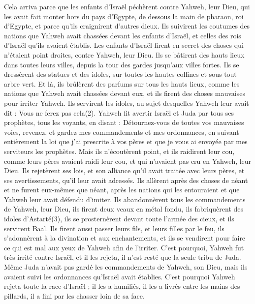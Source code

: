 \begin{multicols}{2}
Cela arriva parce que les enfants d’Israël péchèrent contre Yahweh, leur Dieu, qui les avait fait monter hors du pays d’Egypte, de dessous la main de pharaon, roi d’Egypte, et parce qu’ils craignirent d’autres dieux.
Ils suivirent les coutumes des nations que Yahweh avait chassées devant les enfants d’Israël, et celles des rois d’Israël qu’ils avaient établis.
Les enfants d’Israël firent en secret des choses qui n’étaient point droites, contre Yahweh, leur Dieu. Ils se bâtirent des hauts lieux dans toutes leurs villes, depuis la tour des gardes jusqu’aux villes fortes.
Ils se dressèrent des statues et des idoles, sur toutes les hautes collines et sous tout arbre vert.
Et là, ils brûlèrent des parfums sur tous les hauts lieux, comme les nations que Yahweh avait chassées devant eux, et ils firent des choses mauvaises pour irriter Yahweh.
Ils servirent les idoles, au sujet desquelles Yahweh leur avait dit : Vous ne ferez pas cela(2).
Yahweh fit avertir Israël et Juda par tous ses prophètes, tous les voyants, en disant : Détournez-vous de toutes vos mauvaises voies, revenez, et gardez mes commandements et mes ordonnances, en suivant entièrement la loi que j’ai prescrite à vos pères et que je vous ai envoyée par mes serviteurs les prophètes.
Mais ils n’écoutèrent point, et ils raidirent leur cou, comme leurs pères avaient raidi leur cou, et qui n’avaient pas cru en Yahweh, leur Dieu.
Ils rejetèrent ses lois, et son alliance qu’il avait traitée avec leurs pères, et ses avertissements, qu’il leur avait adressés. Ils allèrent après des choses de néant et ne furent eux-mêmes que néant, après les nations qui les entouraient et que Yahweh leur avait défendu d’imiter.
Ils abandonnèrent tous les commandements de Yahweh, leur Dieu, ils firent deux veaux en métal fondu, ils fabriquèrent des idoles d’Astarté(3), ils se prosternèrent devant toute l’armée des cieux, et ils servirent Baal.
Ils firent aussi passer leurs fils, et leurs filles par le feu, ils s’adonnèrent à la divination et aux enchantements, et ils se vendirent pour faire ce qui est mal aux yeux de Yahweh afin de l’irriter.
C’est pourquoi, Yahweh fut très irrité contre Israël, et il les rejeta, il n’est resté que la seule tribu de Juda.
Même Juda n’avait pas gardé les commandements de Yahweh, son Dieu, mais ils avaient suivi les ordonnances qu’Israël avait établies.
C’est pourquoi Yahweh rejeta toute la race d’Israël ; il les a humiliés, il les a livrés entre les mains des pillards, il a fini par les chasser loin de sa face.

\end{multicols}
